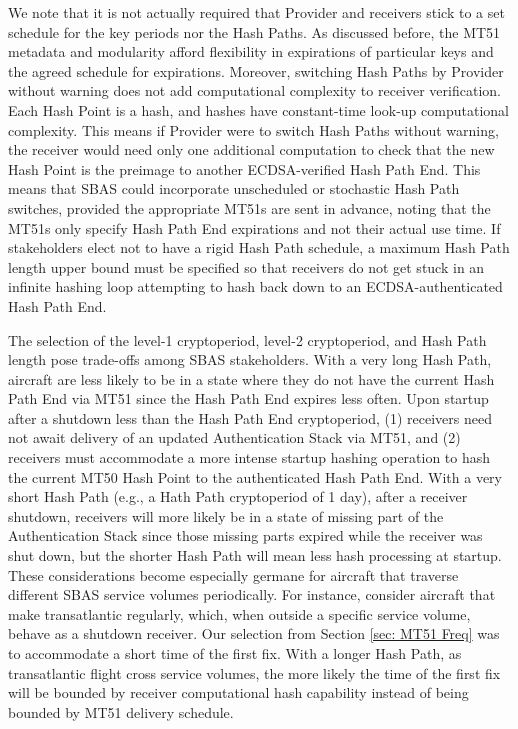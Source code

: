 \documentclass[letterpaper,times]{IONconf/IONconf}
\begin{document}
We note that it is not actually required that Provider and receivers stick to a set schedule for the key periods nor the Hash Paths.
As discussed before, the MT51 metadata and modularity afford flexibility in expirations of particular keys and the agreed schedule for expirations.
Moreover, switching Hash Paths by Provider without warning does not add computational complexity to receiver verification.
Each Hash Point is a hash, and hashes have constant-time look-up computational complexity.
This means if Provider were to switch Hash Paths without warning, the receiver would need only one additional computation to check that the new Hash Point is the preimage to another ECDSA-verified Hash Path End.
This means that SBAS could incorporate unscheduled or stochastic Hash Path switches, provided the appropriate MT51s are sent in advance, noting that the MT51s only specify Hash Path End expirations and not their actual use time.
If stakeholders elect not to have a rigid Hash Path schedule, a maximum Hash Path length upper bound must be specified so that receivers do not get stuck in an infinite hashing loop attempting to hash back down to an ECDSA-authenticated Hash Path End.

The selection of the level-1 cryptoperiod, level-2 cryptoperiod, and Hash Path length pose trade-offs among SBAS stakeholders.
With a very long Hash Path, aircraft are less likely to be in a state where they do not have the current Hash Path End via MT51 since the Hash Path End expires less often.
Upon startup after a shutdown less than the Hash Path End cryptoperiod, (1) receivers need not await delivery of an updated Authentication Stack via MT51, and (2) receivers must accommodate a more intense startup hashing operation to hash the current MT50 Hash Point to the authenticated Hash Path End.
With a very short Hash Path (e.g., a Hath Path cryptoperiod of 1 day), after a receiver shutdown, receivers will more likely be in a state of missing part of the Authentication Stack since those missing parts expired while the receiver was shut down, but the shorter Hash Path will mean less hash processing at startup.
These considerations become especially germane for aircraft that traverse different SBAS service volumes periodically.
For instance, consider aircraft that make transatlantic regularly, which, when outside a specific service volume, behave as a shutdown receiver.
Our selection from Section \ref{sec: MT51 Freq} was to accommodate a short time of the first fix.
With a longer Hash Path, as transatlantic flight cross service volumes, the more likely the time of the first fix will be bounded by receiver computational hash capability instead of being bounded by MT51 delivery schedule. 
\end{document}
